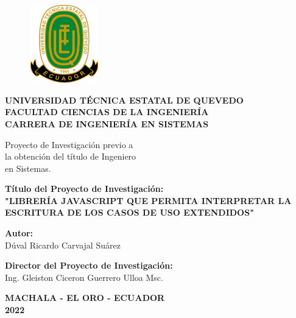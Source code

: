 \begin{center}
		\begin{figure}[htb]
		\begin{center}
			\includegraphics[width=3.04cm,height=3.39cm]{img/logoUTEQ.png}
		\end{center}
	\end{figure}
	{\caratuladc \textbf{UNIVERSIDAD TÉCNICA ESTATAL DE QUEVEDO}}\\
	\vspace*{0.2cm}
	{\titulosndc \textbf{FACULTAD CIENCIAS DE LA INGENIERÍA}}\\
	\vspace*{0.2cm}
	{\titulosndc \textbf{CARRERA DE INGENIERÍA EN SISTEMAS}}\\
	\vspace*{0.2in}
	
	\begin{flushright}
		Proyecto de Investigación previo a \\
		 la obtención del título de Ingeniero \\ en Sistemas. 
	\end{flushright}
	\vspace*{0.2in}
		
	\textbf{Título del Proyecto de Investigación:} \\
	\vspace*{0.3cm}
	\textbf{"LIBRERÍA JAVASCRIPT QUE PERMITA INTERPRETAR LA ESCRITURA DE LOS CASOS DE USO EXTENDIDOS"}
	\vspace*{0.3in}
	
	\textbf{Autor:} \\
	\vspace*{0.3cm}
	Dúval Ricardo Carvajal Suárez
	\vspace*{0.3in}
	
	\textbf{Director del Proyecto de Investigación:} \\
	\vspace*{0.3cm}
	Ing. Gleiston Ciceron Guerrero Ulloa Msc.
	\vspace*{0.3in}
	
	\textbf{MACHALA - EL ORO - ECUADOR} \\
	\textbf{2022}
	
\end{center}